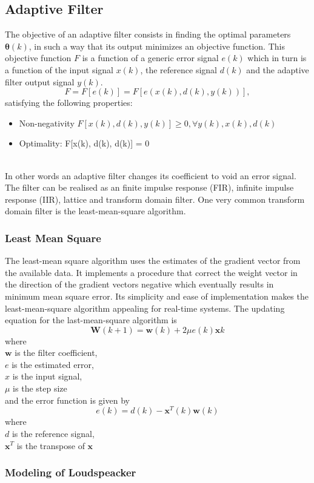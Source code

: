 \subsection{Adaptive Filter}
The objective of an adaptive filter consists in finding the optimal parameters $\mathbf{\theta}(k)$, in such a way that its output minimizes an objective function. This objective function $F$ is a function of a generic error signal $e(k)$ which in turn is a function of the input signal $x(k)$, the reference signal $d(k)$ and the adaptive filter output signal $y(k)$\cite{Louv1984}. 
\begin{equation}
    F = F[e(k)] = F[e(x(k),d(k),y(k))],
\end{equation}
satisfying the following properties:\\
\begin{itemize}
    \item Non-negativity $F[x(k), d(k), y(k)] \geq 0, \forall y(k), x(k), d(k)$
    \item Optimality: F[x(k), d(k), d(k)] = 0
\end{itemize}
\\
In other words an adaptive filter changes its coefficient to void an error signal. The filter can be realised as an finite impulse response (FIR), infinite impulse response (IIR), lattice and transform domain filter. One  very common transform domain filter is the least-mean-square algorithm.\cite{Thakkar2017}

\subsubsection{Least Mean Square}
The least-mean square algorithm uses the estimates of the gradient vector from the available data. It implements a procedure that correct the weight vector in the direction of the gradient vectors negative which eventually results in minimum mean square error. Its simplicity and ease of implementation makes the least-mean-square algorithm appealing for real-time systems.\cite{Thakkar2017}
The updating equation for the last-mean-square algorithm is
\begin{equation}
    \mathbf{W}(k+1) = \mathbf{w}(k) + 2\mu e(k)\mathbf{x}k
\end{equation}
where\\
$\mathbf{w}$ is the filter coefficient,\\
$e$ is the estimated error,\\
$x$ is the input signal,\\
$\mu$ is the step size\\
and the error function is given by
\begin{equation}
    e(k) = d(k) - \mathbf{x}^T(k)\mathbf{w}(k)
\end{equation}
where\\
$d$ is the reference signal,\\
$\mathbf{x}^T$ is the transpose of $\mathbf{x}$


\subsubsection{Modeling of Loudspeacker}


